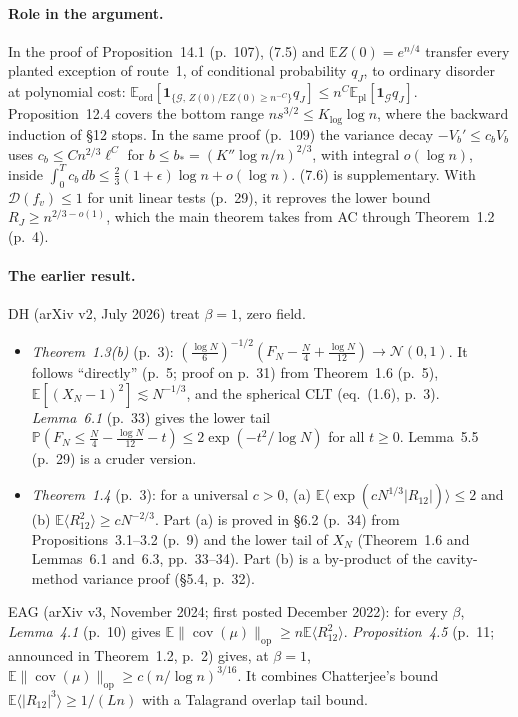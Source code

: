 \documentclass[11pt]{article}
\newcommand{\E}{\mathbb{E}}
\renewcommand{\P}{\mathbb{P}}
\newcommand{\one}{\mathbf{1}}
\newcommand{\D}{\mathcal{D}}
\newcommand{\norm}[1]{\lVert #1\rVert}
\newcommand{\ploc}[2]{#1}
\begin{document}
\paragraph{Role in the argument.}
In \ploc{the proof of Proposition~14.1 (p.~107)}{profile-entropy.tex:239--247},
(7.5) and $\E Z(0)=e^{n/4}$ transfer every planted exception of route~1, of
conditional probability $q_J$, to ordinary disorder at polynomial cost:
$\E_{\mathrm{ord}}[\one_{\{\mathcal G,\,Z(0)/\E Z(0)\ge n^{-C}\}}q_J]\le
n^C\E_{\mathrm{pl}}[\one_{\mathcal G}q_J]$. Proposition~12.4 covers the bottom
range $ns^{3/2}\le K_{\log}\log n$, where the backward induction of \S12 stops.
In \ploc{the same proof (p.~109)}{profile-entropy.tex:410--425} the variance
decay $-V_b'\le c_bV_b$ uses $c_b\le Cn^{2/3}\ell^C$ for
$b\le b_*=(K''\log n/n)^{2/3}$, with integral $o(\log n)$, inside
$\int_0^Tc_b\,db\le\frac23(1+\epsilon)\log n+o(\log n)$.
(7.6) is supplementary. With $\D(f_v)\le1$ for unit linear tests
\ploc{(p.~29)}{profile-spectral.tex:1368--1377}, it reproves the lower bound
$R_J\ge n^{2/3-o(1)}$, which the main theorem takes from AC through
\ploc{Theorem~1.2 (p.~4)}{introduction.tex:80--103}.

\paragraph{The earlier result.}
DH (arXiv v2, July 2026) treat $\beta=1$, zero field.
\begin{itemize}
\item \emph{Theorem~1.3(b)} (p.~3):
 $(\frac{\log N}6)^{-1/2}(F_N-\frac N4+\frac{\log N}{12})\to\mathcal N(0,1)$.
 It follows ``directly'' (p.~5; proof on p.~31) from Theorem~1.6 (p.~5),
 $\E[(X_N-1)^2]\lesssim N^{-1/3}$, and the spherical CLT (eq.~(1.6), p.~3).
 \emph{Lemma~6.1} (p.~33) gives the lower tail
 $\P(F_N\le\frac N4-\frac{\log N}{12}-t)\le2\exp(-t^2/\log N)$ for all
 $t\ge0$. Lemma~5.5 (p.~29) is a cruder version.
\item \emph{Theorem~1.4} (p.~3): for a universal $c>0$,
 (a) $\E\langle\exp(cN^{1/3}|R_{12}|)\rangle\le2$ and
 (b) $\E\langle R_{12}^2\rangle\ge cN^{-2/3}$. Part (a) is proved in \S6.2
 (p.~34) from Propositions~3.1--3.2 (p.~9) and the lower tail of $X_N$
 (Theorem~1.6 and Lemmas~6.1 and~6.3, pp.~33--34). Part (b) is a by-product
 of the cavity-method variance proof (\S5.4, p.~32).
\end{itemize}
EAG (arXiv v3, November 2024; first posted December 2022):
for every $\beta$, \emph{Lemma~4.1} (p.~10) gives
$\E\norm{\operatorname{cov}(\mu)}_{\mathrm{op}}\ge n\E\langle R_{12}^2\rangle$. \emph{Proposition~4.5} (p.~11; announced in Theorem~1.2,
p.~2) gives, at $\beta=1$,
$\E\norm{\operatorname{cov}(\mu)}_{\mathrm{op}}\ge c(n/\log n)^{3/16}$. It
combines Chatterjee's bound $\E\langle|R_{12}|^3\rangle\ge1/(Ln)$ with a
Talagrand overlap tail bound.
\end{document}
